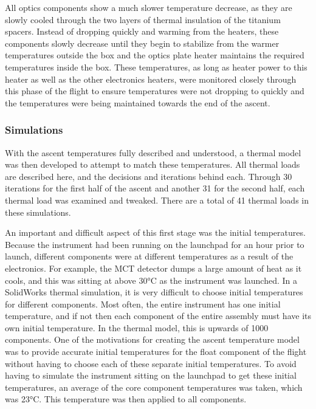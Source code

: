 All optics components show a much slower temperature decrease, as they are slowly cooled through the two layers of thermal insulation of the titanium spacers. Instead of dropping quickly and warming from the heaters, these components slowly decrease until they begin to stabilize from the warmer temperatures outside the box and the optics plate heater maintains the required temperatures inside the box. These temperatures, as long as heater power to this heater as well as the other electronics heaters, were monitored closely through this phase of the flight to ensure temperatures were not dropping to quickly and the temperatures were being maintained towards the end of the ascent.

\subsubsection{Simulations}
With the ascent temperatures fully described and understood, a thermal model was then developed to attempt to match these temperatures. All thermal loads are described here, and the decisions and iterations behind each. Through 30 iterations for the first half of the ascent and another 31 for the second half, each thermal load was examined and tweaked. There are a total of 41 thermal loads in these simulations.

An important and difficult aspect of this first stage was the initial temperatures. Because the instrument had been running on the launchpad for an hour prior to launch, different components were at different temperatures as a result of the electronics. For example, the MCT detector dumps a large amount of heat as it cools, and this was sitting at above 30°C as the instrument was launched. In a SolidWorks thermal simulation, it is very difficult to choose initial temperatures for different components. Most often, the entire instrument has one initial temperature, and if not then each component of the entire assembly must have its own initial temperature. In the thermal model, this is upwards of 1000 components. One of the motivations for creating the ascent temperature model was to provide accurate initial temperatures for the float component of the flight without having to choose each of these separate initial temperatures. To avoid having to simulate the instrument sitting on the launchpad to get these initial temperatures, an average of the core component temperatures was taken, which was 23°C. This temperature was then applied to all components. 

